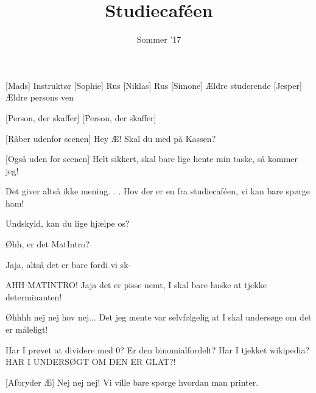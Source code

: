 \documentclass[a4paper,11pt]{article}
\title{Studiecaféen}
\author{Sommer '17}
\begin{document}
\maketitle

\begin{roles}
[Mads] Instruktør
[Sophie] Rus
[Niklas] Rus
[Simone] Ældre studerende
[Jesper] Ældre persons ven
\end{roles}

\begin{props}
[Person, der skaffer]
[Person, der skaffer]
\end{props}


\begin{sketch}


[Råber udenfor scenen] Hey Æ! Skal du med på Kassen?

[Også uden for scenen] Helt sikkert, skal bare lige hente min taske, så kommer jeg!


 Det giver altså ikke mening. . . Hov der er en fra studiecaféen, vi kan bare spørge ham!


 Undskyld, kan du lige hjælpe os?


 Øhh, er det MatIntro?

 Jaja, altså det er bare fordi vi sk-

 AHH MATINTRO! Jaja det er pisse nemt, I skal bare huske at tjekke determinanten!


 Øhhhh nej nej hov nej... Det jeg mente var selvfølgelig at I skal undersøge om det er måleligt!


 Har I prøvet at dividere med 0? Er den binomialfordelt?  Har I tjekket wikipedia? HAR I UNDERSØGT OM DEN ER GLAT?!


[Afbryder Æ] Nej nej nej! Vi ville bare spørge hvordan man printer.

\end{sketch}
\end{document}
